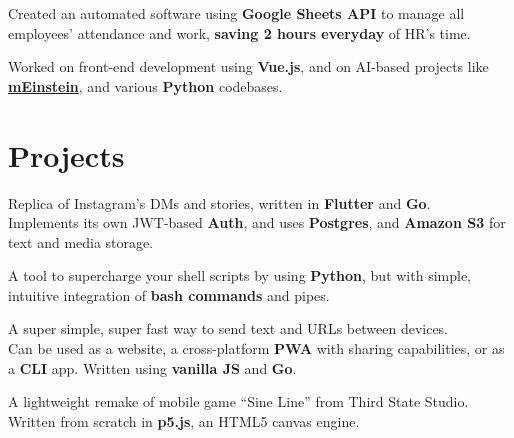 \documentclass[]{resume}
\begin{document}
\begin{minipage}[t]{0.62\textwidth}
\begin{tightemize}
\item Created an automated software using \textbf{Google Sheets API} to manage all employees’ attendance and work, \textbf{saving 2 hours everyday} of HR's time.
\item Worked on front-end development using \textbf{Vue.js}, and on AI-based projects like \href{https://meinstein.ai/}{\textbf{mEinstein}}, and various \textbf{Python} codebases.
\end{tightemize}
\sectionsep



\section{Projects}

Replica of Instagram's DMs and stories, written in \textbf{Flutter} and \textbf{Go}.\\
Implements its own JWT-based \textbf{Auth}, and uses \textbf{Postgres}, and \textbf{Amazon S3} for text and media storage.
\sectionsep

A tool to supercharge your shell scripts by using \textbf{Python}, but with simple, intuitive integration of \textbf{bash commands} and pipes.
\sectionsep

A super simple, super fast way to send text and URLs between devices.\\
Can be used as a website, a cross-platform \textbf{PWA} with sharing capabilities, or as a \textbf{CLI} app. Written using \textbf{vanilla JS} and \textbf{Go}.
\sectionsep

A lightweight remake of mobile game “Sine Line” from Third State Studio.\\
Written from scratch in \textbf{p5.js}, an HTML5 canvas engine.
\sectionsep


\end{minipage}
\end{document}
